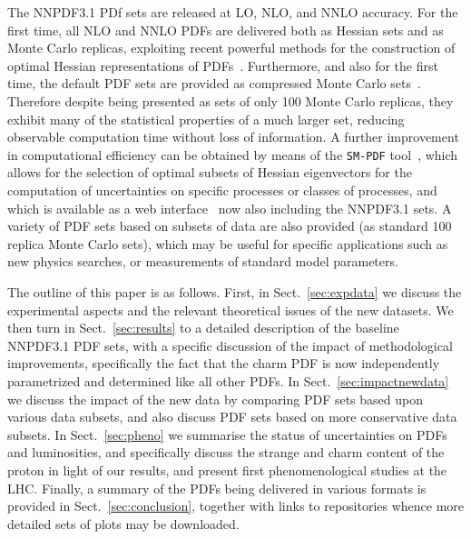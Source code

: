 The NNPDF3.1 PDf sets are released at LO, NLO, and NNLO accuracy. For the first
time, all NLO and NNLO 
PDFs are delivered both as Hessian sets and as Monte Carlo
replicas, exploiting recent powerful methods for the construction of
optimal Hessian representations of 
PDFs~\cite{Carrazza:2015aoa}. Furthermore, and also 
for the first time, the default
PDF sets are provided as compressed Monte Carlo
sets~\cite{Carrazza:2015hva}. Therefore despite being presented
as sets of only 100 Monte Carlo replicas, they exhibit many of
the statistical properties of a much larger set, 
reducing observable computation time without loss of
information. A further improvement in computational efficiency can be
obtained by means of the {\tt SM-PDF} tool~\cite{Carrazza:2016htc}, which
allows for the selection of optimal subsets of Hessian eigenvectors
for the computation of uncertainties on specific processes or classes
of processes, and which is available as a web
interface~\cite{Carrazza:2016wte} now  also including the NNPDF3.1 sets.
A variety
of PDF sets based on subsets of data are also provided (as standard
100 replica Monte Carlo sets), which may be
useful for specific applications such as new physics searches, or measurements of
standard model parameters.

The outline of this paper is as follows.
%
First, in Sect.~\ref{sec:expdata} we discuss the
experimental aspects and the relevant theoretical
issues of the new datasets. 
We then turn in Sect.~\ref{sec:results} to a detailed
description of the baseline NNPDF3.1 PDF sets, with a specific discussion of 
the impact of methodological improvements, specifically the fact that
the charm PDF is now independently parametrized and determined like
all other PDFs. In
Sect.~\ref{sec:impactnewdata} we discuss the impact of the
new data by comparing PDF sets based upon various data subsets, and also
discuss PDF sets based on more conservative data subsets.
In Sect.~\ref{sec:pheno} we summarise the status of uncertainties on PDFs
and luminosities, and
specifically discuss the strange and charm content of the proton in
light of our results, and  present
first phenomenological studies at the LHC.
Finally, a summary of the PDFs being delivered in various formats  is
provided in 
Sect.~\ref{sec:conclusion}, together with links to repositories whence
more detailed sets  of plots may be downloaded.

